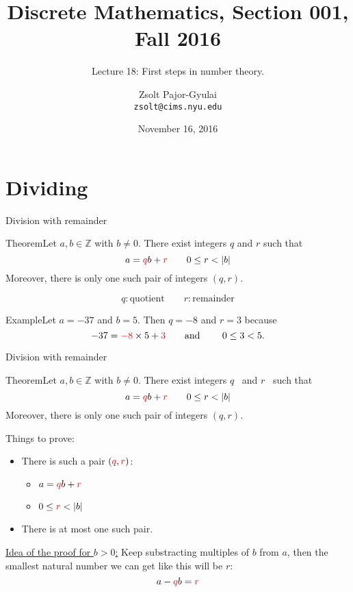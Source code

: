 \documentclass{beamer}
\title{Discrete Mathematics, Section 001, Fall 2016}
\subtitle{Lecture 18: First steps in number theory.}
\date{November 16, 2016}
\author[Zsolt]{Zsolt Pajor-Gyulai \\ \texttt{zsolt@cims.nyu.edu}}
\institute[NYU] 
{
\normalsize Courant Institute of Mathematical Sciences
}
\def\bl[#1]#2{\begin{block}{#1}#2\end{block}}
\def\itemb{\begin{itemize}}
\def\iteme{\end{itemize}}
\begin{document}
\begin{frame}
  \titlepage
\end{frame}


\section{Dividing}

\begin{frame}{Division with remainder}
\bl[Theorem]{Let $a,b\in\mathbb{Z}$ with $b\neq 0$. There exist integers $q$ and $r$ such that
\[
a=\color{red} q\color{black}b+\color{red}r\color{black}\qquad 0\leq r< |b|
\]
Moreover, there is only one such pair of integers $(q,r)$.}
\[
q:\textrm{quotient}\qquad r: \textrm{remainder}
\]

\bl[Example]{Let $a=-37$ and $b=5$. Then $q=-8$ and $r=3$ because
\[
-37=\color{red}-8\color{black}\times 5+\color{red}3\color{black}\qquad\textrm{and }\qquad 0\leq 3<5.
\]\vspace{-0.5cm}}
\end{frame}

\begin{frame}{Division with remainder}
\bl[Theorem]{Let $a,b\in\mathbb{Z}$ with $b\neq 0$. There exist integers \color{red}$q$\color{black}~ and \color{red}$r$\color{black}~ such that
\[
a=\color{red} q\color{black}b+\color{red}r\color{black}\qquad 0\leq r<|b|
\]
Moreover, there is only one such pair of integers $(q,r)$.}
Things to prove:
\itemb
\item There is such a pair $(\color{red}q\color{black},\color{red}r\color{black})$:
\itemb
\item $a=\color{red}q\color{black}b+\color{red}r\color{black}$
\item $0\leq\color{red} r\color{black}<|b|$
\iteme 
\item There is at most one such pair.
\iteme
\vspace{0.3cm}
\underline{Idea of the proof for $b>0$:} Keep substracting multiples of $b$ from $a$, then the smallest natural number we can get like this will be \color{red}$r$\color{black}:
\[
a-\color{red}q\color{black}b=\color{red}r\color{black}
\]

\end{frame}
\end{document}
